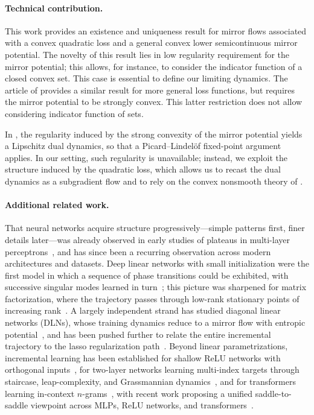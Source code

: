 \documentclass[11pt,english,reqno]{article}
\theoremstyle{plain}
\theoremstyle{definition}
\theoremstyle{remark}
\numberwithin{equation}{section}
\begin{document}
\paragraph{Technical contribution.}This work provides an existence and uniqueness result for mirror flows associated with a convex quadratic loss and a general convex lower semicontinuous mirror potential. The novelty of this result lies in low regularity requirement for the mirror potential; this allows, for instance, to consider the indicator function of a closed convex set. This case is essential to define our limiting dynamics. The article of \cite{attouch2004singular} provides a similar result for more general loss functions, but requires the mirror potential to be strongly convex. This latter restriction does not allow considering indicator function of sets.

In \cite{attouch2004singular}, the regularity induced by the strong convexity of the mirror potential yields a Lipschitz dual dynamics, so that a Picard--Lindelöf fixed-point argument applies. In our setting, such regularity is unavailable; instead, we exploit the structure induced by the quadratic loss, which allows us to recast the dual dynamics as a subgradient flow and to rely on the convex nonsmooth theory of \cite{brezis1973ope,attouch1977convergence}.
%
\paragraph*{Additional related work.}
That neural networks acquire structure progressively---simple patterns first, finer details later---was already observed in early studies of plateaus in multi-layer perceptrons~\cite{fukumizu2000local}, and has since been a recurring observation across modern architectures and datasets. Deep linear networks with small initialization were the first model in which a sequence of phase transitions could be exhibited, with successive singular modes learned in turn~\cite{saxe2014exact,gidel2019implicit,gissin2020implicit}; this picture was sharpened for matrix factorization, where the trajectory passes through low-rank stationary points of increasing rank~\cite{jacot2021saddle}. A largely independent strand has studied diagonal linear networks (DLNs), whose training dynamics reduce to a mirror flow with entropic potential~\cite{woodworth2020kernel}, and has been pushed further to relate the entire incremental trajectory to the lasso regularization path~\cite{berthier2025diagonal,li2023implicit}. Beyond linear parametrizations, incremental learning has been established for shallow ReLU networks with orthogonal inputs~\cite{boursier2022gradient}, for two-layer networks learning multi-index targets through staircase, leap-complexity, and Grassmannian dynamics~\cite{abbe2023sgd,bietti2023learning}, and for transformers learning in-context $n$-grams~\cite{varre2025learning}, with recent work proposing a unified saddle-to-saddle viewpoint across MLPs, ReLU networks, and transformers~\cite{zhang2025saddle}.
%
\end{document}
